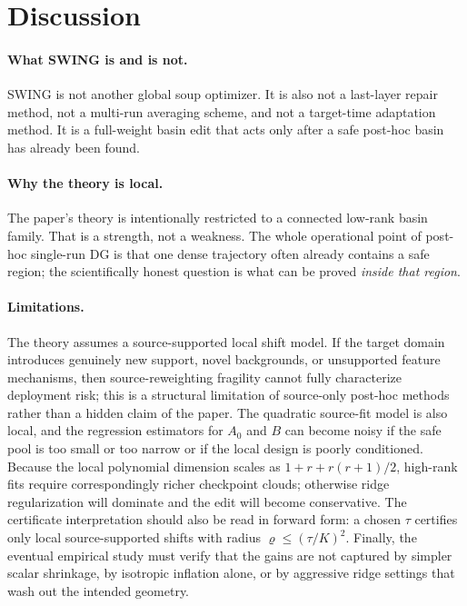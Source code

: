 \documentclass{article}
\newcommand{\swing}{\textup{\textsc{SWING}}}
\begin{document}
\section{Discussion}

\paragraph{What \swing{} is and is not.}
\swing{} is not another global soup optimizer. It is also not a last-layer repair method, not a multi-run averaging scheme, and not a target-time adaptation method. It is a full-weight basin edit that acts only after a safe post-hoc basin has already been found.

\paragraph{Why the theory is local.}
The paper's theory is intentionally restricted to a connected low-rank basin family. That is a strength, not a weakness. The whole operational point of post-hoc single-run DG is that one dense trajectory often already contains a safe region; the scientifically honest question is what can be proved \emph{inside that region}.

\paragraph{Limitations.}
The theory assumes a source-supported local shift model. If the target domain introduces genuinely new support, novel backgrounds, or unsupported feature mechanisms, then source-reweighting fragility cannot fully characterize deployment risk; this is a structural limitation of source-only post-hoc methods rather than a hidden claim of the paper. The quadratic source-fit model is also local, and the regression estimators for \(A_0\) and \(B\) can become noisy if the safe pool is too small or too narrow or if the local design is poorly conditioned. Because the local polynomial dimension scales as \(1+r+r(r+1)/2\), high-rank fits require correspondingly richer checkpoint clouds; otherwise ridge regularization will dominate and the edit will become conservative. The certificate interpretation should also be read in forward form: a chosen \(\tau\) certifies only local source-supported shifts with radius \(\varrho \le (\tau/K)^2\). Finally, the eventual empirical study must verify that the gains are not captured by simpler scalar shrinkage, by isotropic inflation alone, or by aggressive ridge settings that wash out the intended geometry.
\end{document}
